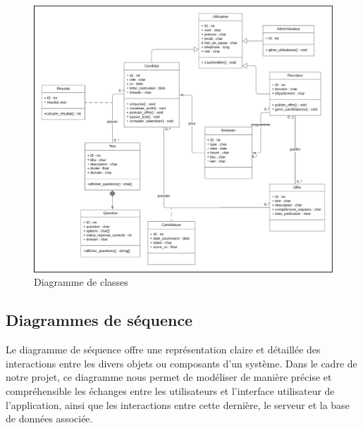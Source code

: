 \begin{figure}[htbp]
   \centering
   \includegraphics[scale=0.3]{Images/classDiagram.png} %
   \caption{Diagramme de classes}
   \label{fig:ClassDiag}
\end{figure}


\subsection{Diagrammes de séquence}
Le diagramme de séquence offre une représentation claire 
et détaillée des interactions entre les divers objets ou 
composants d’un système. Dans le cadre de notre projet, 
ce diagramme nous permet de modéliser de manière précise et 
compréhensible les échanges entre les utilisateurs et l’interface 
utilisateur de l’application, ainsi que les interactions entre cette 
dernière, le serveur et la base de données associée.

